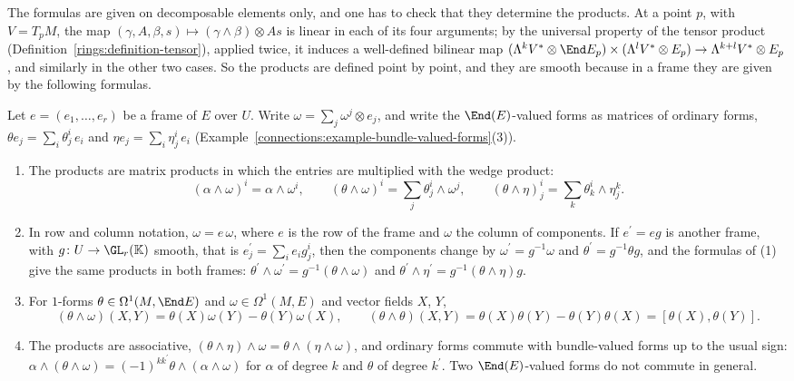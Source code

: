 The formulas are given on decomposable elements only, and one has to check that they determine the products. At a point $p$, with $V = T_pM$, the map
$(\gamma, A, \beta, s) \mapsto (\gamma \wedge \beta) \otimes As$ is linear in each of its four arguments; by the universal property of the tensor product (Definition~\ref{rings:definition-tensor}), applied twice,
it induces a well-defined bilinear map $(\Lambda^kV^* \otimes \End E_p) \times (\Lambda^lV^* \otimes E_p) \to \Lambda^{k+l}V^* \otimes E_p$, and similarly in the other two cases. So the products are defined
point by point, and they are smooth because in a frame they are given by the following formulas.

\begin{proposition}\label{connections:proposition-products}
Let $e = (e_1, \ldots, e_r)$ be a frame of $E$ over $U$. Write $\omega = \sum_j\omega^j \otimes e_j$, and write the $\End(E)$-valued forms as matrices of ordinary forms, $\theta e_j = \sum_i\theta^i_j\,e_i$
and $\eta e_j = \sum_i\eta^i_j\,e_i$ (Example~\ref{connections:example-bundle-valued-forms}(3)).
\begin{enumerate}
\item The products are matrix products in which the entries are multiplied with the wedge product:
\[
(\alpha \wedge \omega)^i = \alpha \wedge \omega^i, \qquad (\theta \wedge \omega)^i = \sum_j\theta^i_j \wedge \omega^j, \qquad (\theta \wedge \eta)^i_j = \sum_k\theta^i_k \wedge \eta^k_j .
\]
\item In row and column notation, $\omega = e\,\omega$, where $e$ is the row of the frame and $\omega$ the column of components. If $e^{\prime} = eg$ is another frame, with $g \colon U \to \GL_r(\mathbb{K})$
smooth, that is $e^{\prime}_j = \sum_ie_ig^i_j$, then the components change by $\omega^{\prime} = g^{-1}\omega$ and $\theta^{\prime} = g^{-1}\theta g$, and the formulas of (1) give the same products in
both frames: $\theta^{\prime} \wedge \omega^{\prime} = g^{-1}(\theta \wedge \omega)$ and $\theta^{\prime} \wedge \eta^{\prime} = g^{-1}(\theta \wedge \eta)g$.
\item For $1$-forms $\theta \in \Omega^1(M, \End E)$ and $\omega \in \Omega^1(M, E)$ and vector fields $X$, $Y$,
\[
(\theta \wedge \omega)(X, Y) = \theta(X)\omega(Y) - \theta(Y)\omega(X), \qquad (\theta \wedge \theta)(X, Y) = \theta(X)\theta(Y) - \theta(Y)\theta(X) = [\theta(X), \theta(Y)] .
\]
\item The products are associative, $(\theta \wedge \eta) \wedge \omega = \theta \wedge (\eta \wedge \omega)$, and ordinary forms commute with bundle-valued forms up to the usual sign:
$\alpha \wedge (\theta \wedge \omega) = (-1)^{kk^{\prime}}\theta \wedge (\alpha \wedge \omega)$ for $\alpha$ of degree $k$ and $\theta$ of degree $k^{\prime}$. Two $\End(E)$-valued forms do not commute in general.
\end{enumerate}
\end{proposition}

